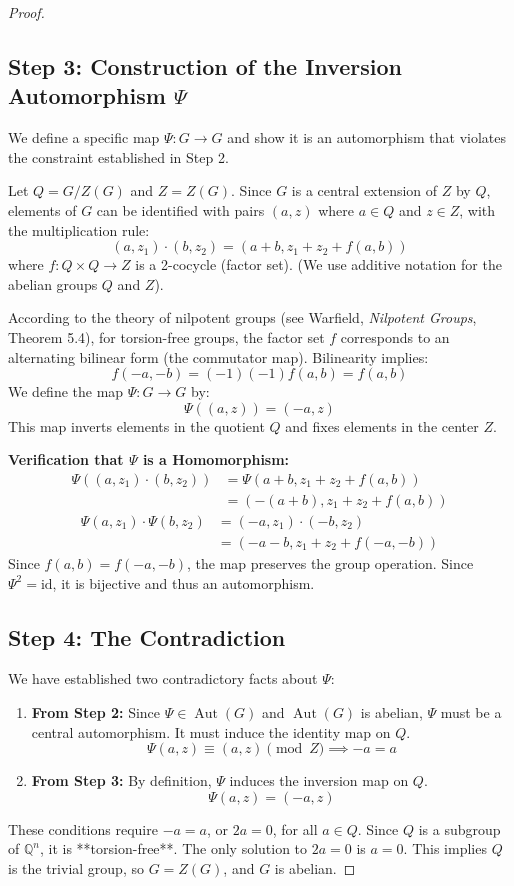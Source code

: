 \documentclass{book}
\begin{document}
\begin{proof}
\subsection*{Step 3: Construction of the Inversion Automorphism $\Psi$}
We define a specific map $\Psi: G \to G$ and show it is an automorphism that violates the constraint established in Step 2.

Let $Q = G/Z(G)$ and $Z = Z(G)$. Since $G$ is a central extension of $Z$ by $Q$, elements of $G$ can be identified with pairs $(a, z)$ where $a \in Q$ and $z \in Z$, with the multiplication rule:
\[
(a, z_1) \cdot (b, z_2) = (a+b, z_1 + z_2 + f(a, b))
\]
where $f: Q \times Q \to Z$ is a 2-cocycle (factor set). (We use additive notation for the abelian groups $Q$ and $Z$).

According to the theory of nilpotent groups (see Warfield, \textit{Nilpotent Groups}, Theorem 5.4), for torsion-free groups, the factor set $f$ corresponds to an alternating bilinear form (the commutator map). Bilinearity implies:
\[
f(-a, -b) = (-1)(-1)f(a, b) = f(a, b)
\]
We define the map $\Psi: G \to G$ by:
\[
\Psi((a, z)) = (-a, z)
\]
This map inverts elements in the quotient $Q$ and fixes elements in the center $Z$.

\textbf{Verification that $\Psi$ is a Homomorphism:}
\begin{align*}
\Psi((a, z_1) \cdot (b, z_2)) &= \Psi(a+b, z_1+z_2+f(a, b)) \\
&= (-(a+b), z_1+z_2+f(a, b))
\end{align*}
\begin{align*}
\Psi(a, z_1) \cdot \Psi(b, z_2) &= (-a, z_1) \cdot (-b, z_2) \\
&= (-a-b, z_1+z_2+f(-a, -b))
\end{align*}
Since $f(a, b) = f(-a, -b)$, the map preserves the group operation. Since $\Psi^2 = \text{id}$, it is bijective and thus an automorphism.

\subsection*{Step 4: The Contradiction}
We have established two contradictory facts about $\Psi$:
\begin{enumerate}
    \item \textbf{From Step 2:} Since $\Psi \in \operatorname{Aut}(G)$ and $\operatorname{Aut}(G)$ is abelian, $\Psi$ must be a central automorphism. It must induce the identity map on $Q$.
    \[ \Psi(a, z) \equiv (a, z) \pmod Z \implies -a = a \]
    \item \textbf{From Step 3:} By definition, $\Psi$ induces the inversion map on $Q$.
    \[ \Psi(a, z) = (-a, z) \]
\end{enumerate}
These conditions require $-a = a$, or $2a = 0$, for all $a \in Q$.
Since $Q$ is a subgroup of $\mathbb{Q}^n$, it is **torsion-free**. The only solution to $2a=0$ is $a=0$.
This implies $Q$ is the trivial group, so $G = Z(G)$, and $G$ is abelian.


\end{proof}
\end{document}
